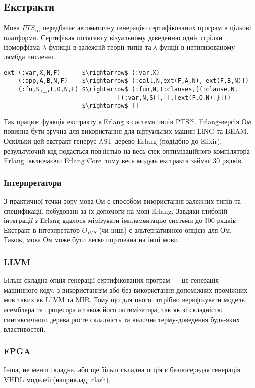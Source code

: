 \subsection*{Екстракти}

Мова $PTS_\infty$ передбачає автоматичну генерацію сертифікованих програм в цільові платформи.
Сертифікая полягаю у візуальному доведенню одніє стрілки ізоморфізма
$\lambda$-функції в залежній теорії типів та $\lambda$-фунції в нетипизованому лямбда численні.

\begin{lstlisting}[mathescape=true]
ext (:var,X,N,F)      $\rightarrow$ (:var,X)
    (:app,A,B,N,F)    $\rightarrow$ (:call,N,ext(F,A,N),[ext(F,B,N)])
    (:fn,S,_,I,O,N,F) $\rightarrow$ (:fun,N,(:clauses,[{:clause,N,
                                [(:var,N,S)],[],[ext(F,O,N)]}]))
                    _ $\rightarrow$ []
\end{lstlisting}

Так працює функція екстракту в Erlang з системи типів PTS$^\infty$.
Erlang-версія Ом повинна бути зручна для використання для
віртуальних машин LING та BEAM. Оскільки цей екстракт генерує
AST дерево Erlang (подідбно до Elixir), результуючий код
подається повністью на весь стек оптимізаційного компілятора
Erlang. включаючи Erlang Core, тому весь модуль екстракта займає 30 рядків.

\subsubsection{Інтерпретатори}
З практичної точки зору мова Ом є способом використання залежних типів
та специфікації, побудовані за їх допомоги на мові Erlang.
Завдяки глибокій інтеграції з Erlang вдалося мімізувати імплементацію системи до 300 рядків.
Екстракт в інтерпретатор $O_{PTS}$ (чи інші) є альтернативною опцією для Ом.
Також, мова Ом може бути легко портована на інші мови.

\subsubsection{LLVM}
Більш складна опція генерації сертифікованих програм --- це генерація машинного коду,
з використанням або без використання допоміжних проміжних мов таких як LLVM та MIR.
Тому що для цього потрібно верифікувати модель асемблера та процесора а також
його оптимізатора, так як зі складністю синтаксичного дерева росте складність
та велична терму-доведення будь-яких властивостей.

\subsubsection{FPGA}
Інша, не менш складна, або ще більш складна опція є безпосередня генерація
VHDL моделей (наприклад, clash).

